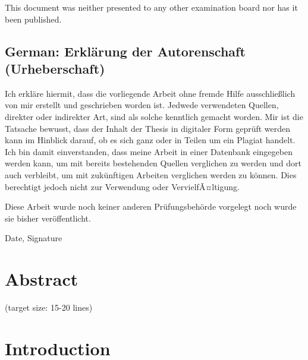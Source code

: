 \documentclass[a4paper,11pt,oneside]{article}
\begin{document}
This document was neither presented to any other examination board
nor has it been published.

\subsection*{German: Erklärung der Autorenschaft (Urheberschaft)}
 
Ich erkläre hiermit, dass die vorliegende Arbeit ohne fremde Hilfe
ausschließlich von mir erstellt und geschrieben worden ist. Jedwede
verwendeten Quellen, direkter oder indirekter Art, sind als solche
kenntlich gemacht worden. Mir ist die Tatsache bewusst, dass der
Inhalt der Thesis in digitaler Form geprüft werden kann im Hinblick
darauf, ob es sich ganz oder in Teilen um ein Plagiat handelt. Ich
bin damit einverstanden, dass meine Arbeit in einer Datenbank
eingegeben werden kann, um mit bereits bestehenden Quellen
verglichen zu werden und dort auch verbleibt, um mit zukünftigen
Arbeiten verglichen werden zu können. Dies berechtigt jedoch nicht
zur Verwendung oder VervielfÃ¤ltigung.

Diese Arbeit wurde noch keiner anderen Prüfungsbehörde vorgelegt
noch wurde sie bisher veröffentlicht.

\vspace{20mm}

Date, Signature

\newpage

\section*{Abstract}
  
   
  
(target size: 15-20 lines)

\newpage
\tableofcontents

\clearpage
{}

\section{Introduction}
  
\end{document}

